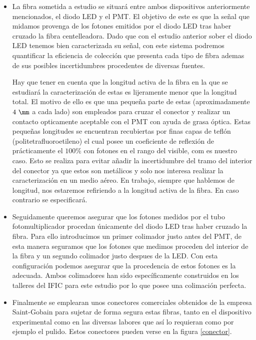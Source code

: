 \begin{itemize}
\item{} La fibra sometida a estudio se situará entre ambos dispositivos anteriormente mencionados, el diodo LED y el PMT. El objetivo de este es que la señal que midamos provenga de los fotones emitidos por el diodo LED tras haber cruzado la fibra centelleadora. Dado que con el estudio anterior sober el diodo LED tenemos bien caracterizada su señal, con este sistema podremos quantificar la eficiencia de colección que presenta cada tipo de fibra ademas de sus posibles incertidumbres procedentes de diversas fuentes.

Hay que tener en cuenta que la longitud activa de la fibra en la que se estudiará la caracterización de estas es lijeramente menor que la longitud total. El motivo de ello es que una pequeña parte de estas (aproximadamente $4~\mm$ a cada lado) son empleados para cruzar el conector y realizar un contacto opticamente aceptable con el PMT con ayuda de grasa óptica. Estas pequeñas longitudes se encuentran recubiertas por finas capas de teflón (politetrafluoroetileno) el cual posee un coeficiente de reflexión de prácticamente el $100\%$ con fotones en el rango del visible, com es nuestro caso. Esto se realiza para evitar añadir la incertidumbre del tramo del interior del conector ya que estos son metálicos y solo nos interesa realizar la caracterización en un medio aéreo. En trabajo, siempre que hablemos de longitud, nos estaremos refiriendo a la longitud activa de la fibra. En caso contrario se especificará.

\item{}Seguidamente queremos asegurar que los fotones medidos por el tubo fotomultiplicador procedan únicamente del diodo LED tras haber cruzado la fibra. Para ello introducimos un primer colimador justo antes del PMT, de esta manera seguramos que los fotones que medimos proceden del interior de la fibra y un segundo colimador justo despues de la LED. Con esta configuración podemos asegurar que la procedencia de estos fotones es la adecuada. Ambos colimadores han sido específicamente construidos en los talleres del IFIC para este estudio por lo que posee una colimación perfecta.

\item{} Finalmente se emplearan unos conectores comerciales obtenidos de la empresa Saint-Gobain para sujetar de forma segura estas fibras, tanto en el dispositivo experimental como en las diversas labores que así lo requieran como por ejemplo el pulido. Estos conectores pueden verse en la figura \ref{conector}.


\end{itemize}
